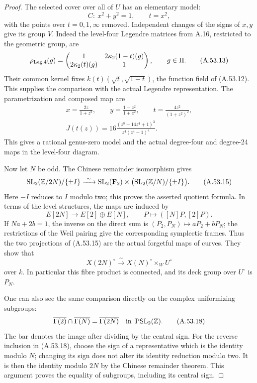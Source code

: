 \begin{proof}
The selected cover over all of $U$ has an elementary model:
\[
 C:\ x^2+y^2=1,\qquad t=x^2,
\tag{A.53.12}
\]
with the points over $t=0,1,\infty$ removed.  Independent changes
of the signs of $x,y$ give its group $V$.  Indeed the level-four
Legendre matrices from A.16, restricted to the geometric group,
are
\[
 \rho_{\rm Leg,4}(g)=
 \begin{pmatrix}
 1&2\kappa_2(1-t)(g)\\2\kappa_2(t)(g)&1
 \end{pmatrix},\qquad g\in\Pi.
\tag{A.53.13}
\]
Their common kernel fixes $k(t)(\sqrt t,\sqrt{1-t})$, the function
field of (A.53.12).  This supplies the comparison with the actual
Legendre representation.  The parametrization and composed map
are
\[
 \begin{gathered}
 x=\frac{2z}{1+z^2},\qquad
 y=\frac{1-z^2}{1+z^2},\qquad
 t=\frac{4z^2}{(1+z^2)^2},\\
 J(t(z))=16\frac{(z^8+14z^4+1)^3}{z^4(z^4-1)^4}.
 \end{gathered}
\tag{A.53.14}
\]
This gives a rational genus-zero model and the actual degree-four
and degree-24 maps in the level-four diagram.

Now let $N$ be odd.  The Chinese remainder isomorphism gives
\[
 \operatorname{SL}_2(\mathbb Z/2N)/\{\pm I\}
  \xrightarrow{\ \sim\ }
 \operatorname{SL}_2(\mathbf F_2)
     \times\bigl(\operatorname{SL}_2(\mathbb Z/N)/\{\pm I\}\bigr).
\tag{A.53.15}
\]
Here $-I$ reduces to $I$ modulo two; this proves the asserted
quotient formula.  In terms of the level structures, the maps are
induced by
\[
 E[2N]\longrightarrow E[2]\oplus E[N],\qquad
                   P\longmapsto([N]P,[2]P).
\tag{A.53.16}
\]
If $Na+2b=1$, the inverse on the direct sum is
$(P_2,P_N)\mapsto aP_2+bP_N$; the restrictions of the Weil
pairing give the corresponding symplectic frames.  Thus the two
projections of (A.53.15) are the actual forgetful maps of curves.
They show that
\[
 X(2N)^\circ\xrightarrow{\ \sim\ }
                     X(N)^\circ\times_W U^\circ
\tag{A.53.17}
\]
over $k$.  In particular this fibre product is connected, and its
deck group over $U^\circ$ is $P_N$.

One can also see the same comparison directly on the complex
uniformizing subgroups:
\[
 \overline{\Gamma(2)}\cap\overline{\Gamma(N)}
                 =\overline{\Gamma(2N)}
       \quad\text{in }\operatorname{PSL}_2(\mathbb Z).
\tag{A.53.18}
\]
The bar denotes the image after dividing by the central sign.
For the reverse inclusion in (A.53.18), choose the sign of a
representative which is the identity modulo $N$; changing its
sign does not alter its identity reduction modulo two.  It is
then the identity modulo $2N$ by the Chinese remainder theorem.
This argument proves the equality of subgroups, including its
central sign.


\end{proof}

